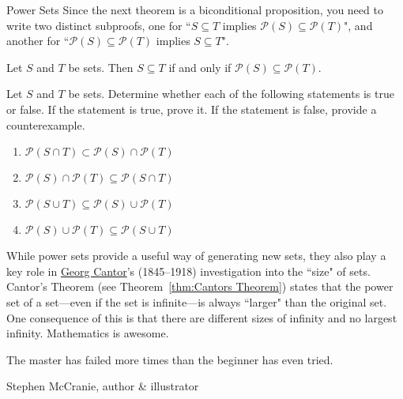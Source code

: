 \begin{section}{Power Sets}
Since the next theorem is a biconditional proposition, you need to write two distinct subproofs, one for ``$S\subseteq T$ implies $\mathcal{P}(S)\subseteq \mathcal{P}(T)$", and another for ``$\mathcal{P}(S)\subseteq \mathcal{P}(T)$ implies $S\subseteq T$".

\begin{theorem}
Let $S$ and $T$ be sets.  Then $S\subseteq T$ if and only if $\mathcal{P}(S)\subseteq \mathcal{P}(T)$.
\end{theorem}

\begin{problem}
Let $S$ and $T$ be sets. Determine whether each of the following statements is true or false. If the statement is true, prove it. If the statement is false, provide a counterexample.
\begin{enumerate}[label=\textrm{(\alph*)}]
\item $\mathcal{P}(S\cap T) \subset \mathcal{P}(S)\cap\mathcal{P}(T)$
\item $\mathcal{P}(S)\cap\mathcal{P}(T)\subseteq \mathcal{P}(S\cap T)$
\item $\mathcal{P}(S\cup T)\subseteq \mathcal{P}(S)\cup\mathcal{P}(T)$
\item $\mathcal{P}(S)\cup\mathcal{P}(T)\subseteq \mathcal{P}(S\cup T)$
\end{enumerate}
\end{problem}

While power sets provide a useful way of generating new sets, they also play a key role in \href{https://en.wikipedia.org/wiki/Georg_Cantor}{Georg Cantor}'s (1845--1918) investigation into the ``size" of sets. Cantor's Theorem (see Theorem~\ref{thm:Cantors Theorem}) states that the power set of a set---even if the set is infinite---is always ``larger" than the original set. One consequence of this is that there are different sizes of infinity and no largest infinity. Mathematics is awesome.

\epigraph{The master has failed more times than the beginner has even tried.}{Stephen McCranie, author \& illustrator}

\end{section}